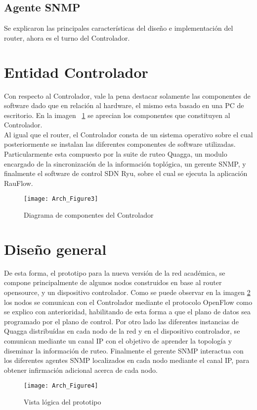 \subsection{Agente SNMP}

Se explicaron las principales caracter\'isticas del dise\~no e implementaci\'on del router, ahora es el turno del Controlador.

\section{Entidad Controlador}
Con respecto al Controlador, vale la pena destacar solamente las componentes de software dado que en relaci\'on al hardware, el mismo esta basado en una PC de escritorio. En la imagen ~\ref{fig:OpenSourceRArch3} se aprecian los componentes que constituyen al Controlador.\\

Al igual que el router, el Controlador consta de un sistema operativo sobre el cual posteriormente se instalan las diferentes componentes de software utilizadas. Particularmente esta compuesto por la suite de ruteo Quagga, un modulo encargado de la sincronizaci\'on de la informaci\'on topl\'ogica, un gerente SNMP, y finalmente el software de control SDN Ryu, sobre el cual se ejecuta la aplicaci\'on RauFlow.

\begin{figure}[htbp!] 
\centering    
\texttt{[image: Arch\_Figure3]}
\caption[OpenSourceRArch3]{Diagrama de componentes del Controlador}
\label{fig:OpenSourceRArch3}
\end{figure}

\section{Dise\~no general}

De esta forma, el prototipo para la nueva versi\'on de la red acad\'emica, se compone principalmente de algunos nodos construidos en base al router opensource, y un dispositivo controlador. Como se puede observar en la imagen \ref{fig:OpenSourceRArch4} los nodos se comunican con el Controlador mediante el protocolo OpenFlow como se explico con anterioridad, habilitando de esta forma a que el plano de datos sea programado por el plano de control. Por otro lado las diferentes instancias de Quagga distribu\'idas en cada nodo de la red y en el dispositivo controlador, se comunican mediante un canal IP con el objetivo de aprender la topolog\'ia y diseminar la informaci\'on de ruteo. Finalmente el gerente SNMP interactua con los diferentes agentes SNMP localizados en cada nodo mediante el canal IP, para obtener infirmaci\'on adicional acerca de cada nodo. 

\begin{figure}[htbp!] 
\centering    
\texttt{[image: Arch\_Figure4]}
\caption[OpenSourceRArch4]{Vista l\'ogica del prototipo}
\label{fig:OpenSourceRArch4}
\end{figure}